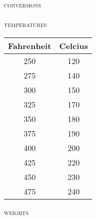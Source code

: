 \documentclass[letterpaper,11pt]{article}
\newcommand{\sectionheader}[1]
{
  \vspace{0.5em}
  {\small\textsc{#1}} \\
  \vspace{1em}
}%
\newcommand{\note}[1]
{
  \small
  \begin{addmargin}{2em}
    $\star$ #1
  \end{addmargin}
}%
\begin{document}
\normalsize

\pagestyle{empty}
{\huge\scshape{conversions}} \\
~ \\

\sectionheader{temperatures}
\begin{tabular}{ c c }
\rowcolor{white}
Fahrenheit & Celcius \\
\hline
\rowcolor{red!5}
250 & 120 \\
\rowcolor{red!10}
275 & 140 \\
\rowcolor{red!15}
300 & 150 \\
\rowcolor{red!20}
325 & 170 \\
\rowcolor{red!25}
350 & 180 \\
\rowcolor{red!30}
375 & 190 \\
\rowcolor{red!35}
400 & 200 \\
\rowcolor{red!40}
425 & 220 \\
\rowcolor{red!45}
450 & 230 \\
\rowcolor{red!50}
475 & 240 \\
\end{tabular}%

\sectionheader{weights}

\end{document}
